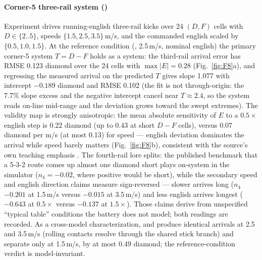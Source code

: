 \paragraph{Corner-5 three-rail system ()}
Experiment  drives running-english three-rail kicks over 24
$(D, F)$ cells with $D \in \{2..5\}$, speeds $\{1.5, 2.5, 3.5\}$\,m/s, and
the commanded english scaled by $\{0.5, 1.0, 1.5\}$. At the reference
condition (, 2.5\,m/s, nominal english) the primary
corner-5 system $T = D - F$ \citep{alciatore_tp_catalog,
cohen2002threecushion} holds as a system: the third-rail arrival error
has RMSE 0.123 diamond over the 24 cells with $\max |E| = 0.28$
(Fig.~\ref{fig:F8}a), and regressing the measured arrival on the predicted
$T$ gives slope 1.077 with intercept $-0.189$ diamond and RMSE 0.102
(the fit is not through-origin: the 7.7\% slope excess and the negative
intercept cancel near $T \approx 2.4$, so the system reads on-line
mid-range and the deviation grows toward the swept extremes). The validity map is strongly
anisotropic: the mean absolute sensitivity of $E$ to a $0.5\times$ english
step is 0.22 diamond (up to 0.43 at short $D-F$ cells), versus 0.07 diamond
per m/s (at most 0.13) for speed --- english deviation dominates the
arrival while speed barely matters (Fig.~\ref{fig:F8}b), consistent with
the source's own teaching emphasis \citep{alciatore_faq}. The fourth-rail lore splits: the published benchmark that a 5-3-2 route
comes up almost one diamond short plays on-system in the simulator
($n_4 = -0.02$, where positive would be short), while the secondary speed
and english direction claims measure sign-reversed --- slower arrives long
($n_4$ $-0.201$ at 1.5\,m/s versus $-0.015$ at 3.5\,m/s) and less english
arrives longest ($-0.643$ at $0.5\times$ versus $-0.137$ at $1.5\times$).
Those claims derive from unspecified ``typical table'' conditions the
battery does not model; both readings are recorded. As a cross-model
characterization,  and 
produce identical arrivals at 2.5 and 3.5\,m/s (rolling contacts resolve
through the shared stick branch) and separate only at 1.5\,m/s, by at most
0.49 diamond; the reference-condition verdict is model-invariant.


